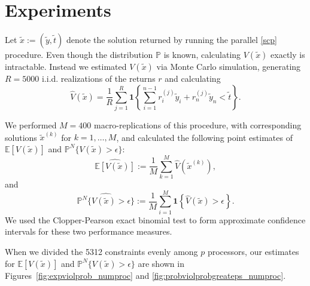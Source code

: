\documentclass[12pt]{article}
\begin{document}
\section*{Experiments}
Let $\tilde{x} := (\tilde{y}, \tilde{t})$ denote the solution returned by running the parallel \ref{scp} procedure.
Even though the distribution $\mathbb{P}$ is known, calculating $V(\tilde{x})$ exactly is intractable.
Instead we estimated $V(\tilde{x})$ via Monte Carlo simulation, generating $R = 5000$ i.i.d. realizations of the returns $r$ and calculating
\[ \hat{V}(\tilde{x}) = \frac{1}{R} \sum_{j = 1}^R \mathbf{1}\left\{ \sum_{i=1}^{n-1} r_i^{(j)} \tilde{y}_i + r_n^{(j)} \tilde{y}_n < \tilde{t}\right\}. \]

We performed $M = 400$ macro-replications of this procedure, with corresponding solutions $\tilde{x}^{(k)}$ for $k = 1, \ldots, M$, and calculated the following point estimates of $\mathbb{E}[V(\tilde{x})]$ and $\mathbb{P}^N\{V(\tilde{x}) > \epsilon\}$:
\[ \widehat{\mathbb{E}[V(\tilde{x})]} := \frac{1}{M} \sum_{k=1}^M \hat{V}(\tilde{x}^{(k)}), \]
and
\[ \widehat{\mathbb{P}^N\{V(\tilde{x}) > \epsilon\}} := \frac{1}{M} \sum_{i=1}^M \mathbf{1}\left\{\hat{V}(\tilde{x}) > \epsilon\right\}. \]
We used the Clopper-Pearson exact binomial test to form approximate confidence intervals for these two performance measures.

When we divided the 5312 constraints evenly among $p$ processors, our estimates for $\mathbb{E}[V(\tilde{x})]$ and $\mathbb{P}^N\{V(\tilde{x}) > \epsilon\}$ are shown in Figures~\ref{fig:expviolprob_numproc} and \ref{fig:probviolprobgreateps_numproc}.

%
\end{document}

